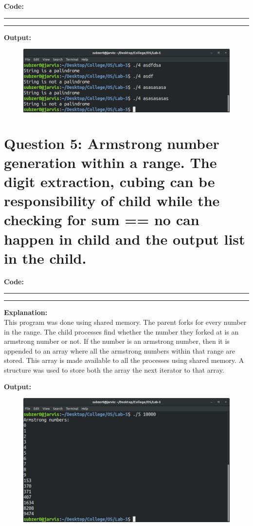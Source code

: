 \documentclass{article}
\begin{document}
\par\noindent
\textbf{\Large Code: }
\smallskip
\par\noindent\rule{\textwidth}{0.4pt}

\par\noindent\rule{\textwidth}{0.4pt}

\bigskip
\noindent
\textbf{\Large Output:}

\begin{figure}[h]
	\includegraphics[width=\textwidth]{output/4.png}
\end{figure}
\bigskip


\section*{Question 5: Armstrong number generation within a range. The digit extraction, cubing can be responsibility of child while the checking for sum == no can happen in child and the output list in the child.}
\bigskip
\bigskip

\par\noindent
\textbf{\Large Code: }
\smallskip
\par\noindent\rule{\textwidth}{0.4pt}

\par\noindent\rule{\textwidth}{0.4pt}

\bigskip
\noindent
\textbf{\Large Explanation: } \\


This program was done using shared memory. The parent forks
for every number in the range. The child processes find whether
the number they forked at is an armstrong number or not. If the
number is an armstrong number, then it is appended to an array
where all the armstrong numbers within that range are stored. This
array is made available to all the processes using shared memory. A 
structure was used to store both the array the next iterator to that
array.


\bigskip
\noindent
\textbf{\Large Output:}

\begin{figure}[h]
	\includegraphics[width=\textwidth]{output/5.png}
\end{figure}
\bigskip
\end{document}
